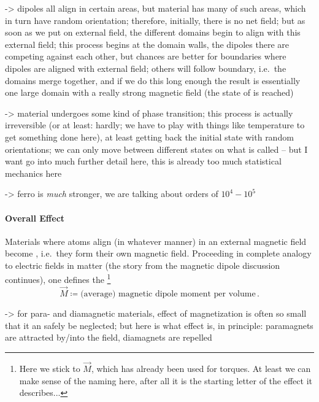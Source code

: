\documentclass[../class_mech_main.tex]{subfiles}
\begin{document}
\begin{itemize}
    -> dipoles all align in certain areas, but material has many of such areas, which in turn have random orientation; therefore, initially, there is no net field; but as soon as we put on external field, the different domains begin to align with this external field; this process begins at the domain walls, the dipoles there are competing against each other, but chances are better for boundaries where dipoles are aligned with external field; others will follow boundary, i.e.~the domains merge together, and if we do this long enough the result is essentially one large domain with a really strong magnetic field (the state of  is reached)

    -> material undergoes some kind of phase transition; this process is actually irreversible (or at least: hardly; we have to play with things like temperature to get something done here), at least getting back the initial state with random orientations; we can only move between different states on what is called  -- but I want go into much further detail here, this is already too much statistical mechanics here
\end{itemize}

-> ferro is \emph{much} stronger, we are talking about orders of $10^4 - 10^5$



            \paragraph{Overall Effect}
Materials where atoms align (in whatever manner) in an external magnetic field become , i.e.~they form their own magnetic field. Proceeding in complete analogy to electric fields in matter (the story from the magnetic dipole discussion continues), one defines the \footnote{Here we stick to $\vec{M}$, which has already been used for torques. At least we can make sense of the naming here, after all it is the starting letter of the effect it describes...}
\begin{equation}
    \vec{M} \coloneqq \text{(average) magnetic dipole moment per volume} \, .
\end{equation}

-> for para- and diamagnetic materials, effect of magnetization is often so small that it an safely be neglected; but here is what effect is, in principle: paramagnets are attracted by/into the field, diamagnets are repelled
\end{document}

